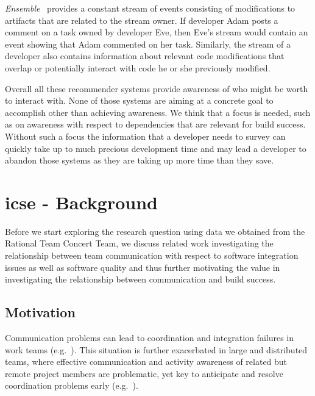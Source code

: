 \emph{Ensemble}~\cite{xiang:rsse:2008} provides a constant stream of events consisting of modifications to artifacts that are related to the stream owner.
If developer Adam posts a comment on a task owned by developer Eve, then Eve's stream would contain an event showing that Adam commented on her task.
Similarly, the stream of a developer also contains information about relevant code modifications that overlap or potentially interact with code he or she previously modified.


Overall all these recommender systems provide awareness of who might be worth to interact with.
None of those systems are aiming at a concrete goal to accomplish other than achieving awareness.
We think that a focus is needed, such as on awareness with respect to dependencies that are relevant for build success.
Without such a focus the information that a developer needs to survey can quickly take up to much precious development time and may lead a developer to abandon those systems as they are taking up more time than they save.



\section{icse - Background}
\label{ch5:bg}
Before we start exploring the research question using data we obtained from the Rational Team Concert Team, we discuss related work investigating the relationship between team communication with respect to software integration issues as well as software quality and thus further motivating the value in investigating the relationship between communication and build success.

\subsection{Motivation}
Communication problems can lead to coordination and integration failures in work
teams (e.g.~\cite{Grinter:1999geography,Herbsleb:1999ew,souza:cscw:2004}). This
situation is further exacerbated in large and distributed teams, where effective
communication and activity awareness of related but remote project members are
problematic, yet key to anticipate and resolve coordination problems early
(e.g.~\cite{Grinter:1999geography,Herbsleb:1999ew}).

